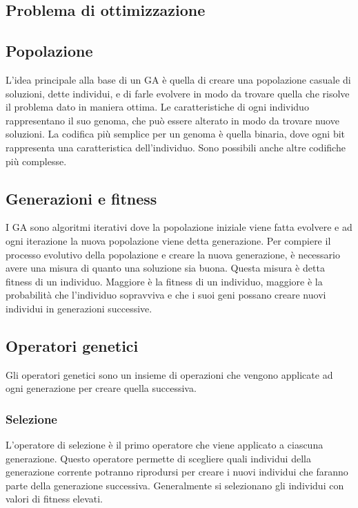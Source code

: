 \documentclass[12pt,a4paper]{article}
\begin{document}
\subsection{Problema di ottimizzazione}

\subsection{Popolazione}
L'idea principale alla base di un GA è quella di creare una popolazione casuale di soluzioni, dette individui, e di farle evolvere in modo da trovare quella che risolve il problema dato in maniera ottima. Le caratteristiche di ogni individuo rappresentano il suo genoma, che può essere alterato in modo da trovare nuove soluzioni. La codifica più semplice per un genoma è quella binaria, dove ogni bit rappresenta una caratteristica dell'individuo. Sono possibili anche altre codifiche più complesse.

\subsection{Generazioni e fitness}
I GA sono algoritmi iterativi dove la popolazione iniziale viene fatta evolvere e ad ogni iterazione la nuova popolazione viene detta generazione.
Per compiere il processo evolutivo della popolazione e creare la nuova generazione, è necessario avere una misura di quanto una soluzione sia buona. Questa misura è detta fitness di un individuo. Maggiore è la fitness di un individuo, maggiore è la probabilità che l'individuo sopravviva e che i suoi geni possano creare nuovi individui in generazioni successive.

\subsection{Operatori genetici}
Gli operatori genetici sono un insieme di operazioni che vengono applicate ad ogni generazione per creare quella successiva.

\subsubsection{Selezione}
L'operatore di selezione è il primo operatore che viene applicato a ciascuna generazione. Questo operatore permette di scegliere quali individui della generazione corrente potranno riprodursi per creare i nuovi individui che faranno parte della generazione successiva.
Generalmente si selezionano gli individui con valori di fitness elevati.
\end{document}
